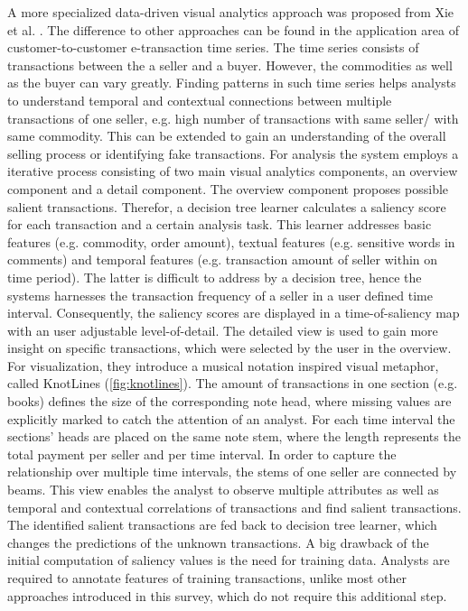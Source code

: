 \documentclass[electronic]{vgtc}             %
\begin{document}
A more specialized data-driven visual analytics approach was proposed from Xie et al. \cite{Xie:2014}.
The difference to other approaches can be found in the application area of customer-to-customer e-transaction time series. 
The time series consists of transactions between the a seller and a buyer.
However, the commodities as well as the buyer can vary greatly.
Finding patterns in such time series helps analysts to understand temporal and contextual connections between multiple transactions of one seller, e.g. high number of transactions with same seller/ with same commodity.
This can be extended to gain an understanding of the overall selling process or identifying fake transactions.
For analysis the system employs a iterative process consisting of two main visual analytics components, an overview component and a detail component.
The overview component proposes possible salient transactions. 
Therefor, a decision tree learner calculates a saliency score for each transaction and a certain analysis task.
This learner addresses basic features (e.g. commodity, order amount), textual features (e.g. sensitive words in comments) and temporal features (e.g. transaction amount of seller within on time period).
The latter is difficult to address by a decision tree, hence the systems harnesses the transaction frequency of a seller in a user defined time interval.
Consequently, the saliency scores are displayed in a time-of-saliency map with an user adjustable level-of-detail. 
The detailed view is used to gain more insight on specific transactions, which were selected by the user in the overview.
For visualization, they introduce a musical notation inspired visual metaphor, called KnotLines (\autoref{fig:knotlines}).
The amount of transactions in one section (e.g. books) defines the size of the corresponding note head, where missing values are explicitly marked to catch the attention of an analyst.
For each time interval the sections' heads are placed on the same note stem, where the length represents the total payment per seller and per time interval.  
In order to capture the relationship over multiple time intervals, the stems of one seller are connected by beams.
This view enables the analyst to observe multiple attributes as well as temporal and contextual correlations of transactions and find salient transactions.
The identified salient transactions are fed back to decision tree learner, which changes the predictions of the unknown transactions.
A big drawback of the initial computation of saliency values is the need for training data. 
Analysts are required to annotate features of training transactions, unlike most other approaches introduced in this survey, which do not require this additional step. 
\end{document}
